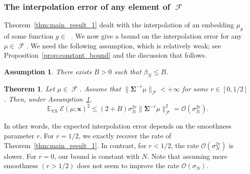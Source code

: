 \documentclass[twoside,11pt]{book}
\newtheorem{theorem}{Theorem}
\newtheorem{assumption}{Assumption}
\numberwithin{theorem}{chapter}
\numberwithin{definition}{chapter}
\numberwithin{proposition}{chapter}
\numberwithin{corollary}{chapter}
\numberwithin{example}{chapter}
\numberwithin{lemma}{chapter}
\DeclareMathOperator{\VS}{\mathrm{VS}}
\DeclareMathOperator{\EX}{\mathbb{E}}
\DeclareMathOperator{\F}{\mathcal{F}}
\DeclareMathOperator{\Ltwo}{\mathbb{L}_{2}(\mathrm{d} \omega)}
\newcommand{\pc}[1]{\textcolor{blue}{#1}}
\begin{document}



\subsubsection{The interpolation error of any element of $\F$}\label{sec:main_theorems_2}
%
%
Theorem~\ref{thm:main_result_1} dealt with the interpolation of an embedding $\mu_{g}$ of some function $g\in\Ltwo$. We now give a bound on the interpolation error for any $\mu\in\F$. We need the following assumption, which is relatively weak; see Proposition~\ref{prop:constant_bound} and the discussion that follows.

\begin{assumption}\label{hyp:beta_N_bounded}
	There exists $B >0$ such that $\beta_{N} \leq B$.
\end{assumption}

\begin{theorem}\label{thm:slow_rates}
Let $\mu \in \F$.
Assume that $\|\bm{\Sigma}^{-r}\mu \|_{\F} < +\infty$ for some $r \in [0,1/2]$. Then, under Assumption~\ref{hyp:beta_N_bounded},
\begin{equation}
\EX_{\VS} \mathcal{E}(\mu;\bm{x})^{2} \leq (2+B) \sigma_{N}^{2r} \|\bm{\Sigma}^{-r} \mu\|_{\F}^{2} = \mathcal{O}(\sigma_{N}^{2r}).
\end{equation}
%
\end{theorem}
%
%
In other words, the expected interpolation error depends on the smoothness parameter $r$. For $r =1/2$, we exactly recover the rate of Theorem~\ref{thm:main_result_1}. In contrast, for $r<1/2$, the rate $\mathcal{O}(\sigma_{N}^{2r})$ is slower. For $r=0$, our bound is constant with $N$. Note that assuming more smoothness $(r>1/2)$ does not seem to improve the rate $\mathcal{O}(\sigma_{N})$.
\end{document}
